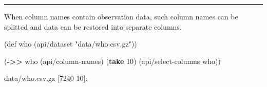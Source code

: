 \documentclass[]{article}
\newenvironment{Shaded}{\begin{snugshade}}{\end{snugshade}}
\newcommand{\BuiltInTok}[1]{#1}
\newcommand{\DecValTok}[1]{\textcolor[rgb]{0.00,0.00,0.81}{#1}}
\newcommand{\FunctionTok}[1]{\textcolor[rgb]{0.00,0.00,0.00}{#1}}
\newcommand{\KeywordTok}[1]{\textcolor[rgb]{0.13,0.29,0.53}{\textbf{#1}}}
\newcommand{\NormalTok}[1]{#1}
\newcommand{\StringTok}[1]{\textcolor[rgb]{0.31,0.60,0.02}{#1}}
\begin{document}
\begin{center}\rule{0.5\linewidth}{0.5pt}\end{center}

When column names contain observation data, such column names can be
splitted and data can be restored into separate columns.

\begin{Shaded}
\begin{Highlighting}[]
\NormalTok{(}\BuiltInTok{def}\FunctionTok{ who }\NormalTok{(api/dataset }\StringTok{"data/who.csv.gz"}\NormalTok{))}
\end{Highlighting}
\end{Shaded}

\begin{Shaded}
\begin{Highlighting}[]
\NormalTok{(}\KeywordTok{->>}\NormalTok{ who}
\NormalTok{     (api/column-names)}
\NormalTok{     (}\KeywordTok{take} \DecValTok{10}\NormalTok{)}
\NormalTok{     (api/select-columns who))}
\end{Highlighting}
\end{Shaded}

data/who.csv.gz {[}7240 10{]}:
\end{document}
